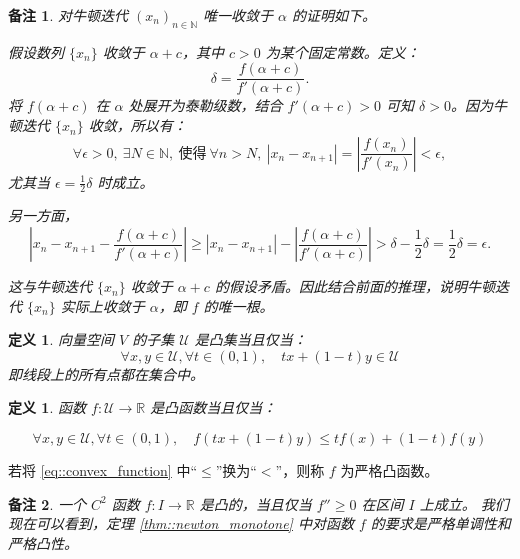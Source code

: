 \documentclass[a4paper]{ctexart}
\newtheorem{remark}{备注}
\newtheorem{definition}[theorem]{定义} %
\numberwithin{theorem}{section}
\numberwithin{equation}{section}
\numberwithin{figure}{section}
\numberwithin{remark}{section}
\begin{document}
\begin{remark}
对牛顿迭代 \( (x_n)_{n \in \mathbb{N}} \) 唯一收敛于 \(\alpha\) 的证明如下。

假设数列 \(\{x_n\}\) 收敛于 \(\alpha + c\)，其中 \(c > 0\) 为某个固定常数。定义：
\[
\delta = \frac{f(\alpha + c)}{f'(\alpha + c)}.
\]
将 \(f(\alpha + c)\) 在 \(\alpha\) 处展开为泰勒级数，结合 \(f'(\alpha + c) > 0\) 可知 \(\delta > 0\)。因为牛顿迭代 \(\{x_n\}\) 收敛，所以有：
\[
\forall \epsilon > 0,\ \exists N \in \mathbb{N},\ \text{使得} \ \forall n > N,\ |x_n - x_{n+1}| = \left| \frac{f(x_n)}{f'(x_n)} \right| < \epsilon,
\]
尤其当 \(\epsilon = \frac{1}{2} \delta\) 时成立。

另一方面，
\[
\left| x_n - x_{n+1} - \frac{f(\alpha + c)}{f'(\alpha + c)} \right|
\geq \left| x_n - x_{n+1} \right| - \left| \frac{f(\alpha + c)}{f'(\alpha + c)} \right|
> \delta - \frac{1}{2} \delta = \frac{1}{2} \delta = \epsilon.
\]

这与牛顿迭代 \(\{x_n\}\) 收敛于 \(\alpha + c\) 的假设矛盾。因此结合前面的推理，说明牛顿迭代 \(\{x_n\}\) 实际上收敛于 \(\alpha\)，即 \(f\) 的唯一根。
\end{remark}

\begin{definition}
    \label{def::convex_set}
向量空间 \(V\) 的子集 \(\mathcal{U}\) 是凸集当且仅当：
\begin{equation}
\forall x, y \in \mathcal{U}, \forall t \in (0,1), \quad tx + (1 - t)y \in \mathcal{U} 
\end{equation}
即线段上的所有点都在集合中。    
\end{definition}

\begin{definition}
函数 \(f : \mathcal{U} \to \mathbb{R}\) 是凸函数当且仅当：

\begin{equation}
    \label{eq::convex_function}
\forall x, y \in \mathcal{U}, \forall t \in (0,1), \quad f(tx + (1 - t)y) \le t f(x) + (1 - t) f(y) 
\end{equation}    
\end{definition}

若将 \ref{eq::convex_function} 中“\(\le\)”换为“\(<\)”，则称 \(f\) 为严格凸函数。


\begin{remark}
一个 \( C^2 \) 函数 \( f : I \to \mathbb{R} \) 是凸的，当且仅当 \( f'' \geq 0 \) 在区间 \( I \) 上成立。
我们现在可以看到，定理 \ref{thm::newton_monotone} 中对函数 \( f \) 的要求是严格单调性和严格凸性。
\end{remark}
\end{document}
